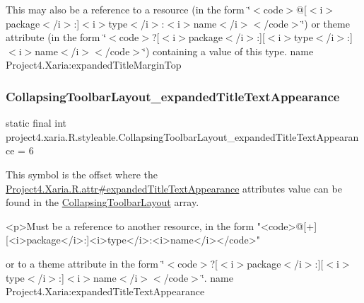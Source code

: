 This may also be a reference to a resource (in the form \char`\"{}$<$code$>$@\mbox{[}$<$i$>$package$<$/i$>$\+:\mbox{]}$<$i$>$type$<$/i$>$\+:$<$i$>$name$<$/i$>$$<$/code$>$\char`\"{}) or theme attribute (in the form \char`\"{}$<$code$>$?\mbox{[}$<$i$>$package$<$/i$>$\+:\mbox{]}\mbox{[}$<$i$>$type$<$/i$>$\+:\mbox{]}$<$i$>$name$<$/i$>$$<$/code$>$\char`\"{}) containing a value of this type.  name Project4.\+Xaria\+:expanded\+Title\+Margin\+Top \mbox{\label{classproject4_1_1xaria_1_1R_1_1styleable_ac2f467b39d5a7471793b18c31578d5a8}} 
\subsubsection{\texorpdfstring{Collapsing\+Toolbar\+Layout\+\_\+expanded\+Title\+Text\+Appearance}{CollapsingToolbarLayout\_expandedTitleTextAppearance}}
{\footnotesize\ttfamily static final int project4.\+xaria.\+R.\+styleable.\+Collapsing\+Toolbar\+Layout\+\_\+expanded\+Title\+Text\+Appearance = 6\hspace{0.3cm}{\ttfamily [static]}}

This symbol is the offset where the \hyperlink{}{Project4.\+Xaria.\+R.\+attr\#expanded\+Title\+Text\+Appearance} attribute\textquotesingle{}s value can be found in the \hyperlink{classproject4_1_1xaria_1_1R_1_1styleable_ac131ed2b7e0e7f05b58231242478b839}{Collapsing\+Toolbar\+Layout} array.

\begin{DoxyVerb}      <p>Must be a reference to another resource, in the form "<code>@[+][<i>package</i>:]<i>type</i>:<i>name</i></code>"
\end{DoxyVerb}
 or to a theme attribute in the form \char`\"{}$<$code$>$?\mbox{[}$<$i$>$package$<$/i$>$\+:\mbox{]}\mbox{[}$<$i$>$type$<$/i$>$\+:\mbox{]}$<$i$>$name$<$/i$>$$<$/code$>$\char`\"{}.  name Project4.\+Xaria\+:expanded\+Title\+Text\+Appearance \mbox{\label{classproject4_1_1xaria_1_1R_1_1styleable_ab62e197d13af2c0b8dee73ebe8c76191}} 
